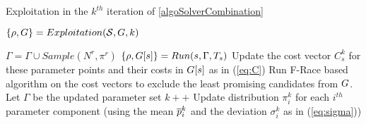 \begin{algorithm}
\caption{Exploitation in the $k^{th}$ iteration of \ref{algoSolverCombination}}
\caption{$\{ \rho, G \}=Exploitation(\mathcal{S}, G, k)$ \label{algoFRace}}
\begin{algorithmic}
  \State {}
  \State $\Gamma  = \Gamma  \cup  Sample(N^{r}, \pi^r)$
   \State
  \ForAll{$\solver \in \solversetall$} 
     \State {}    
      \State $\{ \rho, G[s] \} = Run(s, \Gamma, T_{s})$    
      \State  Update the cost vector $C_s^k$ for these parameter points and their costs in $G[s]$ as in (\ref{eq:C})
     \EndFor
   \State
   \State Run F-Race based algorithm on the cost vectors to exclude the least promising candidates from $G$. 
   \State Let $\Gamma$ be the updated parameter set 
   \State
  \State $k++$  %
  \State Update distribution $\pi_i^k$ for each $i^{th}$ parameter component (using the mean $\overline{p}^k_i$ and the deviation $\sigma^k_i$ as in (\ref{eq:sigma}))
\end{algorithmic}
\end{algorithm}



